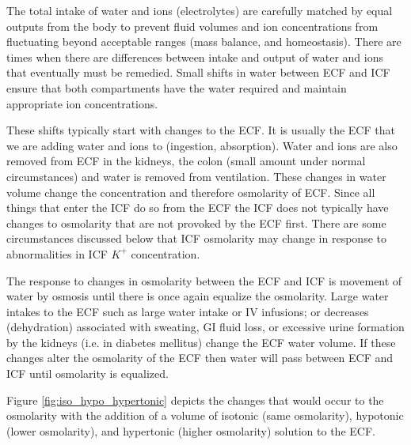The total intake of water and ions (electrolytes) are carefully matched by equal outputs from the body to prevent fluid volumes and ion concentrations from fluctuating beyond acceptable ranges (mass balance, and homeostasis). There are times when there are differences between intake and output of water and ions that eventually must be remedied. Small shifts in water between ECF and ICF ensure that both compartments have the water required and maintain appropriate ion concentrations.

These shifts typically start with changes to the ECF. It is usually the ECF that we are adding water and ions to (ingestion, absorption). Water and ions are also removed from ECF in the kidneys, the colon (small amount under normal circumstances) and water is removed from ventilation.  These changes in water volume change the concentration and therefore osmolarity of ECF. Since all things that enter the ICF do so from the ECF the ICF does not typically have changes to osmolarity that are not provoked by the ECF first. There are some circumstances discussed below that ICF osmolarity may change in response to abnormalities in ICF $K^+$ concentration. 

The response to changes in osmolarity between the ECF and ICF is movement of water by osmosis until there is once again equalize the osmolarity. Large water intakes to the ECF such as large water intake or IV infusions; or decreases (dehydration) associated with sweating, GI fluid loss, or excessive urine formation by the kidneys (i.e. in diabetes mellitus) change the ECF water volume. If these changes alter the osmolarity of the ECF then water will pass between ECF and ICF until osmolarity is equalized.

Figure \ref{fig:iso_hypo_hypertonic} depicts the changes that would occur to the osmolarity with the addition of a volume of isotonic (same osmolarity), hypotonic (lower osmolarity), and hypertonic (higher osmolarity) solution to the ECF.

